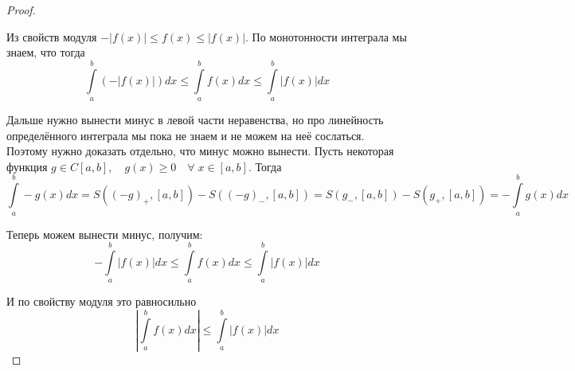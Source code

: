 \documentclass[../main.tex]{subfiles}
\begin{document}
\begin{proof}
    
    ~

    Из свойств модуля \( -\left| f\left( x\right)\right| \leq f\left( x\right) \leq \left| f\left( x\right)\right|\). По монотонности интеграла мы знаем, что тогда 
    \[ \displaystyle\int\limits_{ a}^{ b} \left( -\left| f\left( x\right)\right|\right)dx \leq \displaystyle\int\limits_{ a}^{ b} f\left( x\right)dx \leq \displaystyle\int\limits_{ a}^{ b} \left| f\left( x\right)\right|dx\]

    Дальше нужно вынести минус в левой части неравенства, но про линейность определённого интеграла мы пока не знаем и не можем на неё сослаться. Поэтому нужно доказать отдельно, что минус можно вынести. Пусть некоторая функция \( g \in C\left[ a,b\right],\quad g \left( x\right) \geq 0\quad \forall \; x \in \left[ a,b\right]\). Тогда
    \[\displaystyle\int\limits_{ a}^{ b} -g \left( x\right)dx=S\left( (-g)_+, \left[ a,b\right]\right) - S\left( (-g)_-, \left[ a,b\right]\right)=S\left( g_-, \left[ a,b\right]\right)-S\left( g_+, \left[ a,b\right]\right)=- \displaystyle\int\limits_{ a}^{ b} g \left( x\right)dx\]

    Теперь можем вынести минус, получим:
    \[ - \displaystyle\int\limits_{ a}^{ b} \left| f\left( x\right)\right|dx \leq \displaystyle\int\limits_{ a}^{ b} f\left( x\right)dx \leq \displaystyle\int\limits_{ a}^{ b} \left| f\left( x\right)\right|dx\]

    И по свойству модуля это равносильно
    \[ \left| \displaystyle\int\limits_{ a}^{ b} f\left( x\right)dx\right| \leq \displaystyle\int\limits_{ a}^{ b} \left| f\left( x\right)\right|dx\]
\end{proof}
\end{document}
